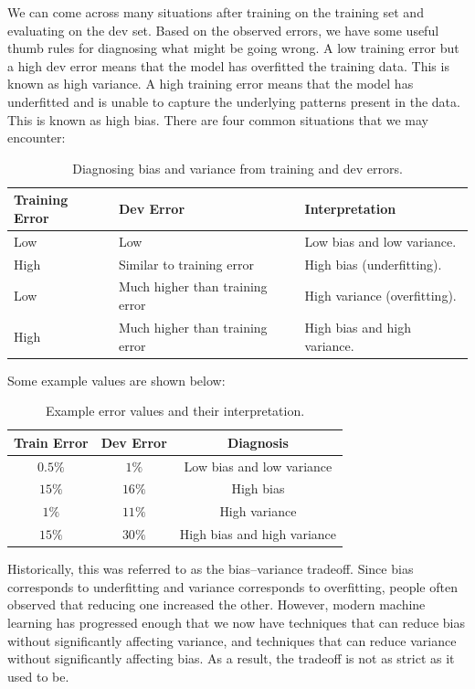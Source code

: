 \documentclass[12pt]{article}
\begin{document}
We can come across many situations after training on the training set and evaluating on the dev set. Based on the observed errors, we have some useful thumb rules for diagnosing what might be going wrong. A low training error but a high dev error means that the model has overfitted the training data. This is known as high variance. A high training error means that the model has underfitted and is unable to capture the underlying patterns present in the data. This is known as high bias. There are four common situations that we may encounter: \begin{table}[h] \centering \caption{Diagnosing bias and variance from training and dev errors.} \begin{tabular}{lll} \toprule Training Error & Dev Error & Interpretation \\ \midrule Low & Low & Low bias and low variance.  \\ High & Similar to training error & High bias (underfitting). \\ Low & Much higher than training error & High variance (overfitting).  \\ High & Much higher than training error & High bias and high variance.  \\ \bottomrule \end{tabular} \end{table} Some example values are shown below: \begin{table}[h] \centering \caption{Example error values and their interpretation.} \begin{tabular}{ccc} \toprule Train Error & Dev Error & Diagnosis \\ \midrule $0.5\%$ & $1\%$ & Low bias and low variance \\ $15\%$ & $16\%$ & High bias \\ $1\%$ & $11\%$ & High variance \\ $15\%$ & $30\%$ & High bias and high variance \\ \bottomrule \end{tabular} \end{table} Historically, this was referred to as the bias--variance tradeoff. Since bias corresponds to underfitting and variance corresponds to overfitting, people often observed that reducing one increased the other. However, modern machine learning has progressed enough that we now have techniques that can reduce bias without significantly affecting variance, and techniques that can reduce variance without significantly affecting bias. As a result, the tradeoff is not as strict as it used to be.
\end{document}
